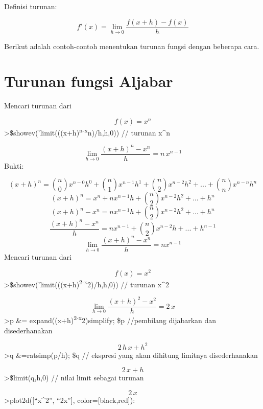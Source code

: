 \documentclass[
]{book}
\begin{document}
Definisi turunan:

\[f'(x) = \lim_{h\to 0}\frac{f(x+h)-f(x)}{h}\]

Berikut adalah contoh-contoh menentukan turunan fungsi dengan beberapa cara.

\section{Turunan fungsi Aljabar}\label{turunan-fungsi-aljabar}

Mencari turunan dari

\[f(x)=x^n\]\textgreater\$showev('limit(((x+h)\textsuperscript{n-x}n)/h,h,0)) // turunan x\^{}n

\[\lim_{h\rightarrow 0}{\frac{\left(x+h\right)^{n}-x^{n}}{h}}=n\,x^{n  -1}\]Bukti:

\[(x+h)^n= \binom{n}{0}x^{n-0}h^0+ \binom{n}{1}x^{n-1}h^1+\binom{n}{2}x^{n-2}h^2+...+\binom{n}{n}x^{n-n}h^n\]\[(x+h)^n = x^n+nx^{n-1}h+\binom{n}{2}x^{n-2}h^2+...+h^n\]\[(x+h)^n -x^n = nx^{n-1}h+\binom{n}{2}x^{n-2}h^2+...+h^n\]\[\frac{(x+h)^n -x^n}{h} = nx^{n-1}+\binom{n}{2}x^{n-2}h+...+h^{n-1}\]\[ \lim_{h\to 0}\frac{(x+h)^n -x^n}{h}=nx^{n-1}\]Mencari turunan dari

\[f(x)=x^2\]\textgreater\$showev('limit(((x+h)\textsuperscript{2-x}2)/h,h,0)) // turunan x\^{}2

\[\lim_{h\rightarrow 0}{\frac{\left(x+h\right)^2-x^2}{h}}=2\,x\]\textgreater p \&= expand((x+h)\textsuperscript{2-x}2)\textbar simplify; \$p //pembilang dijabarkan dan disederhanakan

\[2\,h\,x+h^2\]\textgreater q \&=ratsimp(p/h); \$q // ekspresi yang akan dihitung limitnya disederhanakan

\[2\,x+h\]\textgreater\$limit(q,h,0) // nilai limit sebagai turunan

\[2\,x\]\textgreater plot2d({[}``x\^{}2'', ``2x''{]}, color={[}black,red{]}):
\end{document}
